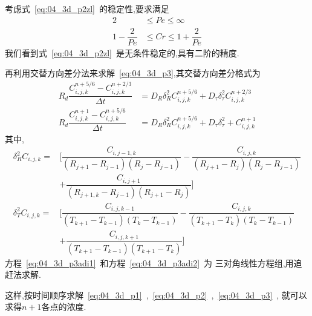 考虑式~\eqref{eq:04_3d_p2zl}~的稳定性,要求满足
\begin{align}
2 & \leq Pe \leq \infty\\
1-\dfrac{2}{Pe}&\leq Cr\leq 1+\dfrac{2}{Pe}
\end{align}
我们看到式~\eqref{eq:04_3d_p2zl}~是无条件稳定的,具有二阶的精度.\par
再利用交替方向差分法来求解~\eqref{eq:04_3d_p3},其交替方向差分格式为
\begin{align}
R_d\dfrac{C_{i,j,k}^{n+5/6}-C_{i,j,k}^{n+2/3}}{\Delta t} &=
D_R\delta_R^2 C_{i,j,k}^{n+5/6}+D_{\tau}\delta^2_{\tau}C_{i,j,k}^{n+2/3} \label{eq:04_3d_p3adi1}\\
R_d\dfrac{C_{i,j,k}^{n+1}-C_{i,j,k}^{n+5/6}}{\Delta t}&=D_R\delta_R^2 C_{i,j,k}^{n+5/6}+D_{\tau}\delta_{\tau}^2+C_{i,j,k}^{n+1} \label{eq:04_3d_p3adi2} 
\end{align}
其中,
\begin{equation*}
\begin{split}
\delta_R^2 C_{i,j,k} =& [\dfrac{C_{i,j-1,k}}{(R_{j+1}-R_{j-1})(R_j-R_{j-1})}
-\dfrac{C_{i,j,k}}{(R_{j+1}-R_j)(R_j-R_{j-1})} \\
&+\dfrac{C_{i,j+1}}{(R_{j+1,k}-R_{j-1})(R_{j+1}-R_j)}] \\
\delta_T^2 C_{i,j,k} =& [\dfrac{C_{i,j,k-1}}{(T_{k+1}-T_{k-1})(T_k-T_{k-1})}-
\dfrac{C_{i,j,k}}{(T_{k+1}-T_k)(T_k-T_{k-1})} \\
&+\dfrac{C_{i,j,k+1}}{(T_{k+1}-T_{k-1})(T_{k+1}-T_k)}]
\end{split}
\end{equation*}
方程~\eqref{eq:04_3d_p3adi1}~和方程~\eqref{eq:04_3d_p3adi2}~为
三对角线性方程组,用追赶法求解.\par
这样,按时间顺序求解~\eqref{eq:04_3d_p1}~,~\eqref{eq:04_3d_p2}~,~\eqref{eq:04_3d_p3}~,
就可以求得$n+1$各点的浓度.